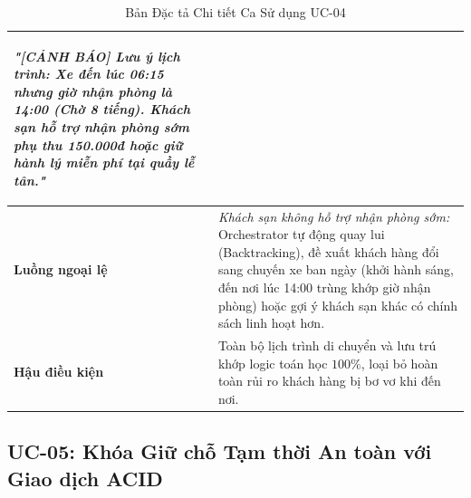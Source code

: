 \begin{table}[h!]
\begin{tabular}{|p{3.2cm}|p{11.5cm}|}
\begin{enumerate}
    \textit{"[CẢNH BÁO] Lưu ý lịch trình: Xe đến lúc 06:15 nhưng giờ nhận phòng là 14:00 (Chờ 8 tiếng). Khách sạn hỗ trợ nhận phòng sớm phụ thu 150.000đ hoặc giữ hành lý miễn phí tại quầy lễ tân."}
\end{enumerate} \\
\hline
\textbf{Luồng ngoại lệ} & 
\textit{Khách sạn không hỗ trợ nhận phòng sớm:} Orchestrator tự động quay lui (Backtracking), đề xuất khách hàng đổi sang chuyến xe ban ngày (khởi hành sáng, đến nơi lúc 14:00 trùng khớp giờ nhận phòng) hoặc gợi ý khách sạn khác có chính sách linh hoạt hơn. \\
\hline
\textbf{Hậu điều kiện} & Toàn bộ lịch trình di chuyển và lưu trú khớp logic toán học $100\%$, loại bỏ hoàn toàn rủi ro khách hàng bị bơ vơ khi đến nơi. \\
\hline
\end{tabular}
\caption{Bản Đặc tả Chi tiết Ca Sử dụng UC-04}
\label{tab:spec_uc04}
\end{table}

\subsection{UC-05: Khóa Giữ chỗ Tạm thời An toàn với Giao dịch ACID}
\label{subsec:spec_uc05}

